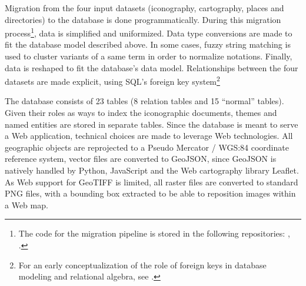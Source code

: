 \documentclass[12pt, a4paper, twocolumn]{article}
\begin{document}
Migration from the four input datasets (iconography, cartography, places and directories) to the database  is done programmatically. During this migration process\footnote{The code for the migration pipeline is stored in the following repositories: \cite{kerveganRichDataData2024}, \cite{kerveganRichDataData2024a}.}, data is simplified and uniformized. Data type conversions are made to fit the database model described above. In some cases, fuzzy string matching is used to cluster variants of a same term in order to normalize notations. Finally, data is reshaped to fit the database's data model. Relationships between the four datasets are made explicit, using SQL's foreign key system\footnote{For an early conceptualization of the role of foreign keys in database modeling and relational algebra, see \cite[379-381]{coddRelationalModelData1970}.}

The database consists of 23 tables (8 relation tables and 15 ``normal'' tables). Given their roles as ways to index the iconographic documents,  themes and named entities are stored in separate tables. Since the database is meant to serve a Web application, technical choices are made to leverage Web technologies. All geographic objects are reprojected to a Pseudo Mercator / WGS:84 coordinate reference system, vector files are converted to GeoJSON, since GeoJSON is natively handled by Python, JavaScript and the Web cartography library Leaflet. As Web support for GeoTIFF is limited, all raster files are converted to standard PNG files, with a bounding box extracted to be able to reposition images within a Web map.
\end{document}
